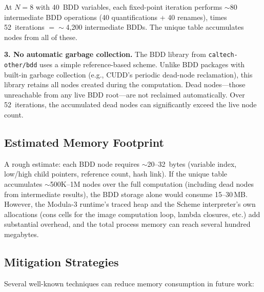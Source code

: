 \documentclass[11pt]{article}
\begin{document}
At $N=8$ with 40~BDD variables, each fixed-point iteration performs
$\sim$80 intermediate BDD operations (40 quantifications + 40 renames),
times 52~iterations $= \sim$4,200 intermediate BDDs.  The unique table
accumulates nodes from all of these.

\textbf{3. No automatic garbage collection.}
The BDD library from \texttt{caltech-other/bdd} uses a simple
reference-based scheme.  Unlike BDD packages with built-in garbage
collection (e.g., CUDD's periodic dead-node reclamation), this library
retains all nodes created during the computation.  Dead nodes---those
unreachable from any live BDD root---are not reclaimed automatically.
Over 52~iterations, the accumulated dead nodes can significantly
exceed the live node count.

\subsection{Estimated Memory Footprint}

A rough estimate: each BDD node requires $\sim$20--32~bytes (variable
index, low/high child pointers, reference count, hash link).  If the
unique table accumulates $\sim$500K--1M nodes over the full
computation (including dead nodes from intermediate results), the BDD
storage alone would consume 15--30\,MB.  However, the Modula-3
runtime's traced heap and the Scheme interpreter's own allocations
(cons cells for the image computation loop, lambda closures, etc.) add
substantial overhead, and the total process memory can reach several
hundred megabytes.

\subsection{Mitigation Strategies}

Several well-known techniques can reduce memory consumption in future
work:
\end{document}
